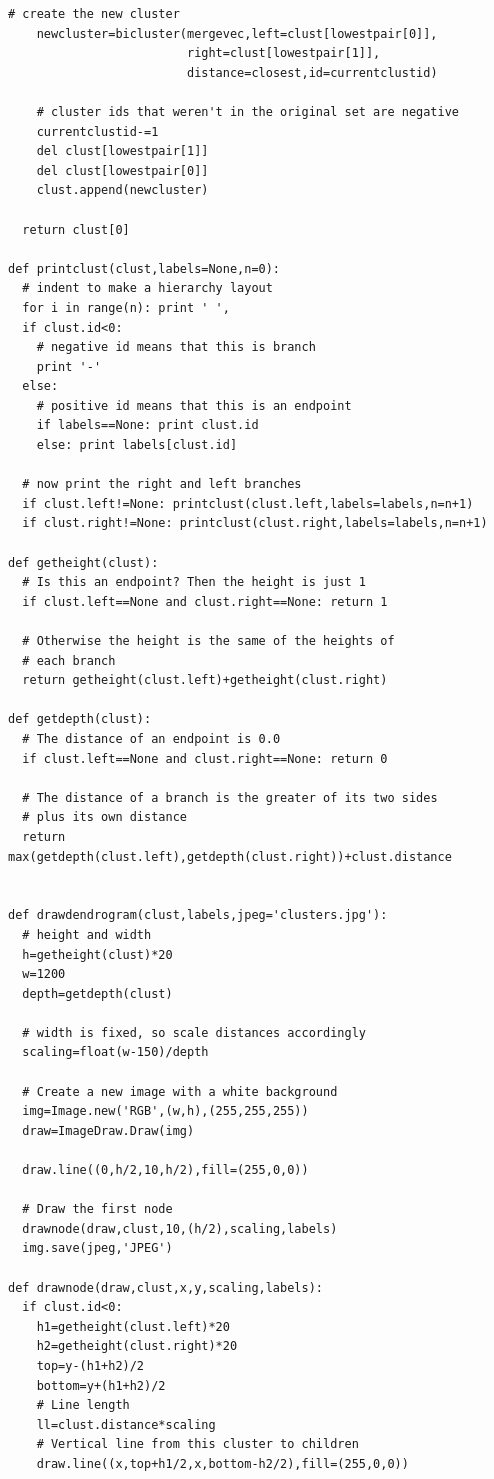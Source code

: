 \documentclass{article}
\begin{document}
\begin{lstlisting}[frame=single, caption=clusters.py, label=clusters]
    # create the new cluster
    newcluster=bicluster(mergevec,left=clust[lowestpair[0]],
                         right=clust[lowestpair[1]],
                         distance=closest,id=currentclustid)

    # cluster ids that weren't in the original set are negative
    currentclustid-=1
    del clust[lowestpair[1]]
    del clust[lowestpair[0]]
    clust.append(newcluster)

  return clust[0]

def printclust(clust,labels=None,n=0):
  # indent to make a hierarchy layout
  for i in range(n): print ' ',
  if clust.id<0:
    # negative id means that this is branch
    print '-'
  else:
    # positive id means that this is an endpoint
    if labels==None: print clust.id
    else: print labels[clust.id]

  # now print the right and left branches
  if clust.left!=None: printclust(clust.left,labels=labels,n=n+1)
  if clust.right!=None: printclust(clust.right,labels=labels,n=n+1)

def getheight(clust):
  # Is this an endpoint? Then the height is just 1
  if clust.left==None and clust.right==None: return 1

  # Otherwise the height is the same of the heights of
  # each branch
  return getheight(clust.left)+getheight(clust.right)

def getdepth(clust):
  # The distance of an endpoint is 0.0
  if clust.left==None and clust.right==None: return 0

  # The distance of a branch is the greater of its two sides
  # plus its own distance
  return max(getdepth(clust.left),getdepth(clust.right))+clust.distance


def drawdendrogram(clust,labels,jpeg='clusters.jpg'):
  # height and width
  h=getheight(clust)*20
  w=1200
  depth=getdepth(clust)

  # width is fixed, so scale distances accordingly
  scaling=float(w-150)/depth

  # Create a new image with a white background
  img=Image.new('RGB',(w,h),(255,255,255))
  draw=ImageDraw.Draw(img)

  draw.line((0,h/2,10,h/2),fill=(255,0,0))    

  # Draw the first node
  drawnode(draw,clust,10,(h/2),scaling,labels)
  img.save(jpeg,'JPEG')

def drawnode(draw,clust,x,y,scaling,labels):
  if clust.id<0:
    h1=getheight(clust.left)*20
    h2=getheight(clust.right)*20
    top=y-(h1+h2)/2
    bottom=y+(h1+h2)/2
    # Line length
    ll=clust.distance*scaling
    # Vertical line from this cluster to children    
    draw.line((x,top+h1/2,x,bottom-h2/2),fill=(255,0,0))    
    

\end{lstlisting}
\end{document}
